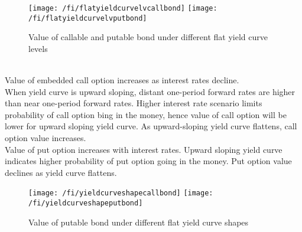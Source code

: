 \begin{figure}[H]
\centering
\texttt{[image: /fi/flatyieldcurvelvcallbond]}
\texttt{[image: /fi/flatyieldcurvelvputbond]}
\caption{Value of callable and putable bond under different flat yield curve levels}
\end{figure}

\begin{remark} \\
Value of embedded call option increases as interest rates decline.\\
When yield curve is upward sloping, distant one-period forward rates are higher than near one-period forward rates. Higher interest rate scenario limits probability of call option bing in the money, hence value of call option will be lower for upward sloping yield curve. As upward-sloping yield curve flattens, call option value increases.\\
Value of put option increases with interest rates. Upward sloping yield curve indicates higher probability of put option going in the money. Put option value declines as yield curve flattens.
\end{remark}

\begin{figure}[H]
\centering
\texttt{[image: /fi/yieldcurveshapecallbond]}
\texttt{[image: /fi/yieldcurveshapeputbond]}
\caption{Value of putable bond under different flat yield curve shapes}
\end{figure}


